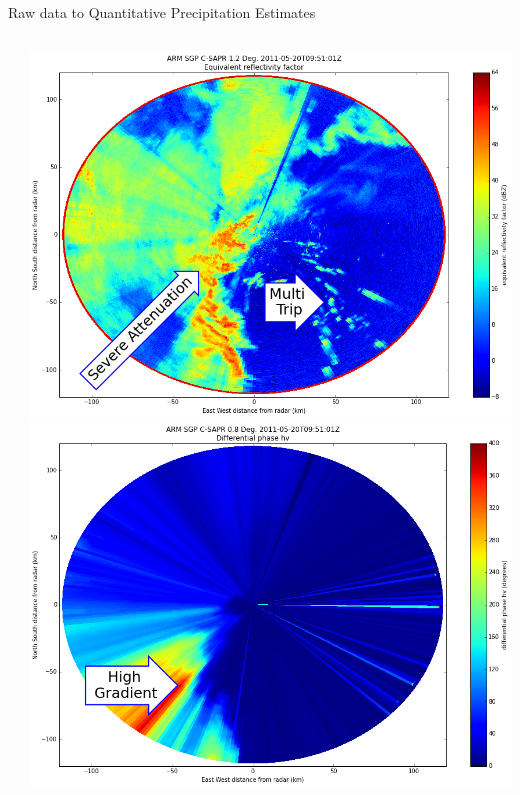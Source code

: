 \documentclass[final]{beamer}
\begin{document}
\begin{frame}{}
\begin{columns}[t]
\begin{column}{.3\linewidth}
\begin{block}{Raw data to Quantitative Precipitation Estimates}
\begin{columns}[t]
\begin{column}{.4\linewidth}
\begin{itemize}
		\end{itemize}
		\end{column}
                \begin{column}{.6\linewidth}
                \begin{columns}[t]
                \begin{column}{.5\linewidth}
                		\includegraphics[width=.95\linewidth]{figures/ze.png}\\[1ex]  %
           		\includegraphics[width=.95\linewidth]{figures/phidp_f.png}\\[1ex]   %

\end{column}
\end{columns}
\end{column}
\end{columns}
\end{block}
\end{column}
\end{columns}
\end{frame}
\end{document}
